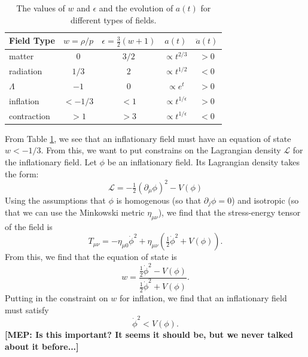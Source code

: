 \documentclass[onecolumn,apj]{emulateapj}
\def\L{\mathscr{L}}
\def\half{\tfrac{1}{2}}
\newcommand{\mep}[1]{{\color{applegreen} \textbf{[MEP:  #1]}}}
\begin{document}
\begin{table}[htbp]
   \centering
   \begin{tabular}{@{} lcccc @{}} %
      \toprule
      Field Type & $w=\rho/p$ &  $\epsilon=\tfrac{3}{2}(w+1)$ & $a(t)$ & $\ddot a(t)$ \\
      \midrule
      matter & 0 & $3/2$ & $\propto t^{2/3}$ & $>0$ \\
       radiation & $1/3$ & $2$ & $\propto t^{1/2}$ & $<0$ \\
       $\Lambda$ & $-1$ & $0$ & $\propto e^t$ & $>0$ \\
       inflation & $<-1/3$ & $<1$ & $\propto t^{1/\epsilon}$ & $>0$ \\
       contraction & $>1$ & $>3$ & $\propto t^{1/\epsilon}$ & $<0$ \\
      \bottomrule
   \end{tabular}
   \caption{The values of $w$ and $\epsilon$ and the evolution of $a(t)$ for different types of fields.}
   \label{tab:field_scenarios}
\end{table}


From Table \ref{tab:field_scenarios}, we see that an inflationary field must have an equation of state $w<-1/3$. From this, we want to put constrains on the Lagrangian density $\L$ for the inflationary field. Let $\phi$ be an inflationary field. Its Lagrangian density takes the form:
\begin{equation}
\L = -\half ( \partial_\mu \phi)^2 - V(\phi)
\end{equation}
Using the assumptions that $\phi$ is homogenous (so that $\partial_j \phi = 0$) and isotropic (so that we can use the Minkowski metric $\eta_{\mu\nu}$), we find that the stress-energy tensor of the field is
\begin{equation}
T_{\mu\nu} = -\eta_{\mu 0} \dot \phi^2 + \eta_{\mu\nu}(\half\dot \phi^2+V(\phi)).
\end{equation}
From this, we find that the equation of state is
\begin{equation}
w = \frac{\half \dot \phi^2 - V(\phi)}{\half \dot \phi^2 + V(\phi)}.
\label{eqn:w}
\end{equation}
Putting in the constraint on $w$ for inflation, we find that an inflationary field must satisfy 
\begin{equation}
\dot \phi^2 < V(\phi).
\end{equation}
\mep{Is this important? It seems it should be, but we never talked about it before...}
\end{document}
